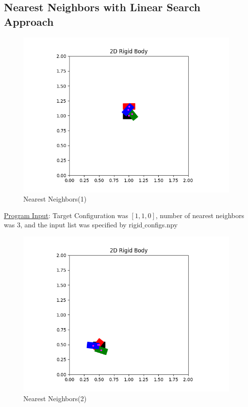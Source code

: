 \documentclass{article}
\begin{document}
\subsection{Nearest Neighbors with Linear Search Approach}
\begin{figure}[h!]
	\includegraphics[width= 0.9 \linewidth]{P2_NearestNeighbor(1).png}
	\centering
	\caption{Nearest Neighbors(1)}
	\label{P2_NearestNeighbor(1).png}
\end{figure}

\underline{Program Input}: Target Configuration was $[1, 1, 0]$, number of nearest neighbors was 3, and the input list was specified by rigid$\_$configs.npy
\newpage 
\begin{figure}[h!]
	\includegraphics[width= 0.9 \linewidth]{P2_NearestNeighbor(2).png}
	\centering
	\caption{Nearest Neighbors(2)}
	\label{P2_NearestNeighbor(2).png}
\end{figure}
\end{document}

